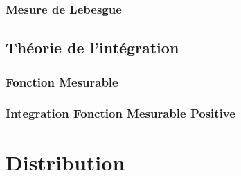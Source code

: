 \documentclass[3pt]{article}
\begin{document}
\bigskip 

\subsubsection{Mesure de Lebesgue}

\subsection{Th\'{e}orie de l'int\'{e}gration}

\bigskip 

\subsubsection{Fonction Mesurable}

\bigskip

\subsubsection{Integration Fonction Mesurable Positive}

\bigskip 

\bigskip 

\section{Distribution}

\bigskip
\end{document}
